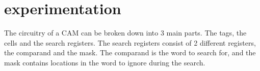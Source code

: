 \section{experimentation}
The circuitry of a CAM can be broken down into 3 main parts. The tags, the cells and the search registers. 
The search registers consist of 2 different registers, the comparand and the mask. The comparand is the word to search for, and the mask contains locations in the word to ignore during the search.